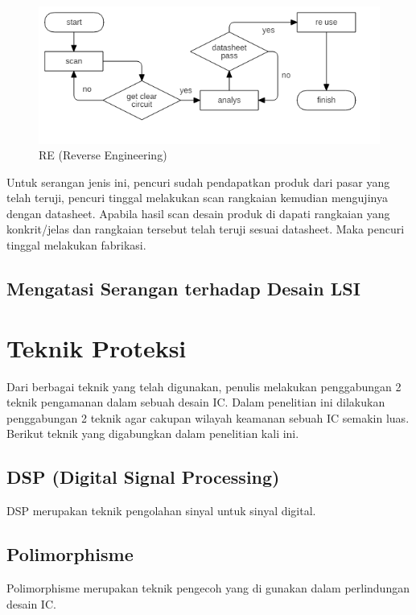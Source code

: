\begin{figure}
	\centering
	\includegraphics[width=1.05\textwidth]
	{diagrams/reverseEngineering.png}
	\caption{RE (Reverse Engineering)}
	\label{fig:reverseengineering}
\end{figure}

Untuk serangan jenis ini, pencuri sudah pendapatkan produk dari pasar yang telah teruji, pencuri tinggal melakukan scan rangkaian kemudian mengujinya dengan datasheet. Apabila hasil scan desain produk di dapati rangkaian yang konkrit/jelas dan rangkaian tersebut telah teruji sesuai datasheet. Maka pencuri tinggal melakukan fabrikasi.

\subsection{Mengatasi Serangan terhadap Desain LSI}

\section{Teknik Proteksi}
Dari berbagai teknik yang telah digunakan, penulis melakukan penggabungan 2 teknik pengamanan dalam sebuah desain IC. Dalam penelitian ini dilakukan penggabungan 2 teknik agar cakupan wilayah keamanan sebuah IC semakin luas. Berikut teknik yang digabungkan dalam penelitian kali ini.

\subsection{DSP (Digital Signal Processing)}
DSP merupakan teknik pengolahan sinyal untuk sinyal digital.

\subsection{Polimorphisme}
Polimorphisme merupakan teknik pengecoh yang di gunakan dalam perlindungan desain IC. 

